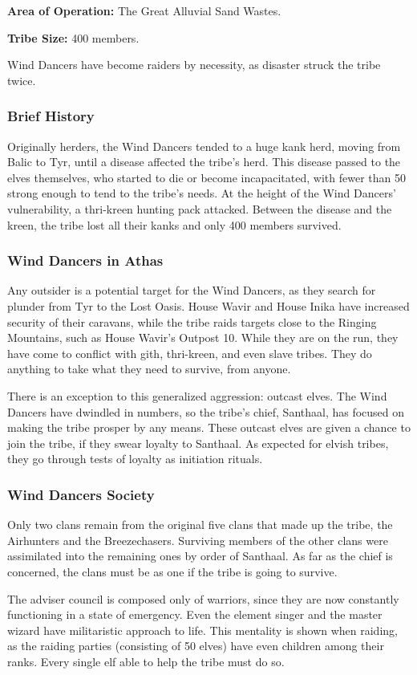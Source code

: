 \textbf{Area of Operation:} The Great Alluvial Sand Wastes.

\textbf{Tribe Size:} 400 members.

Wind Dancers have become raiders by necessity, as disaster struck the tribe twice.

\subsubsection{Brief History}
Originally herders, the Wind Dancers tended to a huge kank herd, moving from Balic to Tyr, until a disease affected the tribe's herd. This disease passed to the elves themselves, who started to die or become incapacitated, with fewer than 50 strong enough to tend to the tribe's needs. At the height of the Wind Dancers' vulnerability, a thri-kreen hunting pack attacked. Between the disease and the kreen, the tribe lost all their kanks and only 400 members survived.

\subsubsection{Wind Dancers in Athas}
Any outsider is a potential target for the Wind Dancers, as they search for plunder from Tyr to the Lost Oasis. House Wavir and House Inika have increased security of their caravans, while the tribe raids targets close to the Ringing Mountains, such as House Wavir's Outpost 10. While they are on the run, they have come to conflict with gith, thri-kreen, and even slave tribes. They do anything to take what they need to survive, from anyone.

There is an exception to this generalized aggression: outcast elves. The Wind Dancers have dwindled in numbers, so the tribe's chief, Santhaal, has focused on making the tribe prosper by any means. These outcast elves are given a chance to join the tribe, if they swear loyalty to Santhaal. As expected for elvish tribes, they go through tests of loyalty as initiation rituals.

\subsubsection{Wind Dancers Society}
Only two clans remain from the original five clans that made up the tribe, the Airhunters and the Breezechasers. Surviving members of the other clans were assimilated into the remaining ones by order of Santhaal. As far as the chief is concerned, the clans must be as one if the tribe is going to survive.

The adviser council is composed only of warriors, since they are now constantly functioning in a state of emergency. Even the element singer and the master wizard have militaristic approach to life. This mentality is shown when raiding, as the raiding parties (consisting of 50 elves) have even children among their ranks. Every single elf able to help the tribe must do so.
